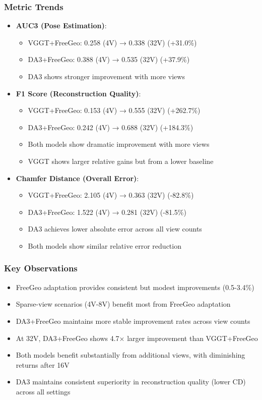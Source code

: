 \documentclass{article}
\begin{document}
\subsubsection{Metric Trends}
\begin{itemize}
    \item \textbf{AUC3 (Pose Estimation)}:
    \begin{itemize}
        \item VGGT+FreeGeo: 0.258 (4V) → 0.338 (32V) (+31.0\%)
        \item DA3+FreeGeo: 0.388 (4V) → 0.535 (32V) (+37.9\%)
        \item DA3 shows stronger improvement with more views
    \end{itemize}

    \item \textbf{F1 Score (Reconstruction Quality)}:
    \begin{itemize}
        \item VGGT+FreeGeo: 0.153 (4V) → 0.555 (32V) (+262.7\%)
        \item DA3+FreeGeo: 0.242 (4V) → 0.688 (32V) (+184.3\%)
        \item Both models show dramatic improvement with more views
        \item VGGT shows larger relative gains but from a lower baseline
    \end{itemize}

    \item \textbf{Chamfer Distance (Overall Error)}:
    \begin{itemize}
        \item VGGT+FreeGeo: 2.105 (4V) → 0.363 (32V) (-82.8\%)
        \item DA3+FreeGeo: 1.522 (4V) → 0.281 (32V) (-81.5\%)
        \item DA3 achieves lower absolute error across all view counts
        \item Both models show similar relative error reduction
    \end{itemize}
\end{itemize}

\subsubsection{Key Observations}
\begin{itemize}
    \item FreeGeo adaptation provides consistent but modest improvements (0.5-3.4\%)
    \item Sparse-view scenarios (4V-8V) benefit most from FreeGeo adaptation
    \item DA3+FreeGeo maintains more stable improvement rates across view counts
    \item At 32V, DA3+FreeGeo shows 4.7× larger improvement than VGGT+FreeGeo
    \item Both models benefit substantially from additional views, with diminishing returns after 16V
    \item DA3 maintains consistent superiority in reconstruction quality (lower CD) across all settings
\end{itemize}
\end{document}
